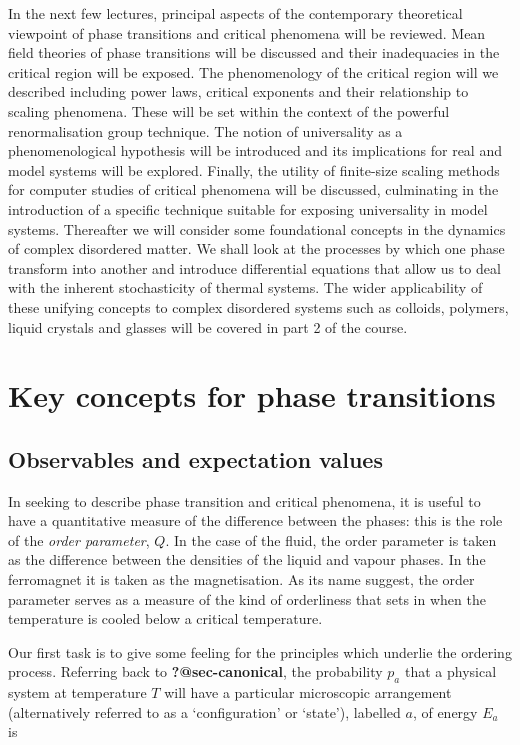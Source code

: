 \documentclass[
  letterpaper,
  DIV=11,
  numbers=noendperiod]{scrreprt}
\begin{document}
In the next few lectures, principal aspects of the contemporary
theoretical viewpoint of phase transitions and critical phenomena will
be reviewed. Mean field theories of phase transitions will be discussed
and their inadequacies in the critical region will be exposed. The
phenomenology of the critical region will we described including power
laws, critical exponents and their relationship to scaling phenomena.
These will be set within the context of the powerful renormalisation
group technique. The notion of universality as a phenomenological
hypothesis will be introduced and its implications for real and model
systems will be explored. Finally, the utility of finite-size scaling
methods for computer studies of critical phenomena will be discussed,
culminating in the introduction of a specific technique suitable for
exposing universality in model systems. Thereafter we will consider some
foundational concepts in the dynamics of complex disordered matter. We
shall look at the processes by which one phase transform into another
and introduce differential equations that allow us to deal with the
inherent stochasticity of thermal systems. The wider applicability of
these unifying concepts to complex disordered systems such as colloids,
polymers, liquid crystals and glasses will be covered in part 2 of the
course.

\chapter{Key concepts for phase transitions}\label{sec-background}

\section{Observables and expectation
values}\label{observables-and-expectation-values}

In seeking to describe phase transition and critical phenomena, it is
useful to have a quantitative measure of the difference between the
phases: this is the role of the \emph{order parameter}, \(Q\). In the
case of the fluid, the order parameter is taken as the difference
between the densities of the liquid and vapour phases. In the
ferromagnet it is taken as the magnetisation. As its name suggest, the
order parameter serves as a measure of the kind of orderliness that sets
in when the temperature is cooled below a critical temperature.

Our first task is to give some feeling for the principles which underlie
the ordering process. Referring back to \textbf{?@sec-canonical}, the
probability \(p_a\) that a physical system at temperature \(T\) will
have a particular microscopic arrangement (alternatively referred to as
a `configuration' or `state'), labelled \(a\), of energy \(E_a\) is
\end{document}
